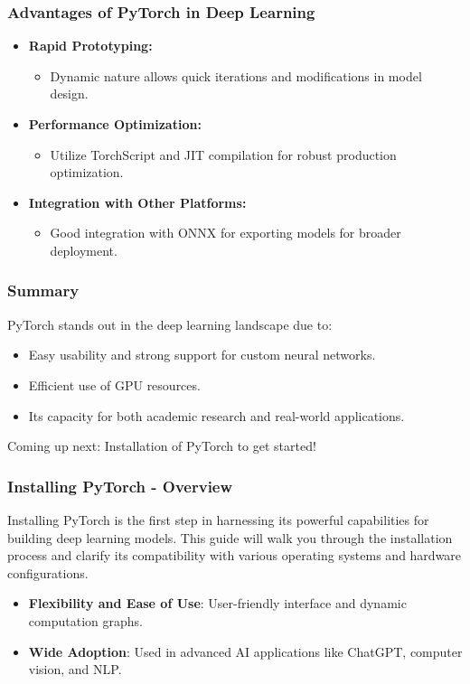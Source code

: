\documentclass[aspectratio=169]{beamer}
\begin{document}
\begin{frame}[fragile]
    \frametitle{Advantages of PyTorch in Deep Learning}
    \begin{itemize}
        \item \textbf{Rapid Prototyping:} 
            \begin{itemize}
                \item Dynamic nature allows quick iterations and modifications in model design.
            \end{itemize}
        \item \textbf{Performance Optimization:} 
            \begin{itemize}
                \item Utilize TorchScript and JIT compilation for robust production optimization.
            \end{itemize}
        \item \textbf{Integration with Other Platforms:} 
            \begin{itemize}
                \item Good integration with ONNX for exporting models for broader deployment.
            \end{itemize}
    \end{itemize}
\end{frame}

\begin{frame}[fragile]
    \frametitle{Summary}
    PyTorch stands out in the deep learning landscape due to:
    \begin{itemize}
        \item Easy usability and strong support for custom neural networks.
        \item Efficient use of GPU resources.
        \item Its capacity for both academic research and real-world applications.
    \end{itemize}
    Coming up next: Installation of PyTorch to get started!
\end{frame}

\begin{frame}[fragile]
    \frametitle{Installing PyTorch - Overview}
    Installing PyTorch is the first step in harnessing its powerful capabilities for building deep learning models. This guide will walk you through the installation process and clarify its compatibility with various operating systems and hardware configurations.
    
    \begin{itemize}
        \item \textbf{Flexibility and Ease of Use}: User-friendly interface and dynamic computation graphs.
        \item \textbf{Wide Adoption}: Used in advanced AI applications like ChatGPT, computer vision, and NLP.
    \end{itemize}
\end{frame}
\end{document}
